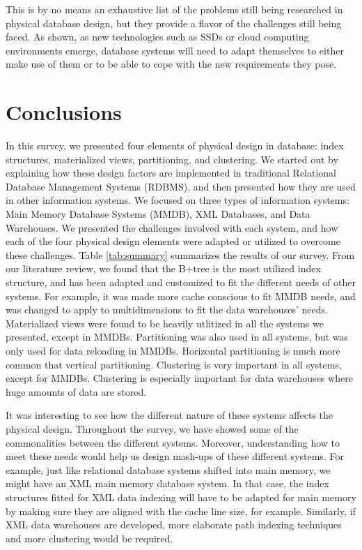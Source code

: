 \documentclass[12pt,a4paper]{article}
\begin{document}
This is by no means an exhaustive list of the problems still being researched in physical database design, but they provide a flavor of the challenges still
being faced. As shown, as new technologies such as SSDs or cloud computing environments emerge, database systems will need to adapt themselves to either make
use of them or to be able to cope with the new requirements they pose.

\section{Conclusions}
\label{SEC-CONCL}

In this survey, we presented four elements of physical design in database: index structures, materialized views, partitioning, and clustering. We started out
by explaining how these design factors are implemented in traditional Relational Database Management Systems (RDBMS), and then presented how they are used in
other information systems. We focused on three types of information systems: Main Memory Database Systems (MMDB), XML Databases, and Data Warehouses. We
presented the challenges involved with each system, and how each of the four physical design elements were adapted or utilized to overcome these
challenges. Table \ref{tab:summary} summarizes the results of our survey. From our literature review, we found that the B+tree is the most utilized index
structure, and has been adapted and customized to fit the different needs of other systems. For example, it was made more cache conscious to fit MMDB needs,
and was changed to apply to multidimensions to fit the data warehouses' needs. Materialized views were found to be heavily utlitized in all the systems we
presented, except in MMDBs. Partitioning was also used in all systems, but was only used for data reloading in MMDBs. Horizontal partitioning is much more
common that vertical partitioning. Clustering is very important in all systems, except for MMDBs. Clustering is especially important for data warehouses
where huge amounts of data are stored.

It was interesting to see how the different nature of these systems affects the physical design. Throughout the survey, we have showed some of the
commonalities between the different systems. Moreover, understanding how to meet these needs would help us design mash-ups of these different systems. For
example, just like relational database systems shifted into main memory, we might have an XML main memory database system. In that case, the index structures
fitted for XML data indexing will have to be adapted for main memory by making sure they are aligned with the cache line size, for example. Similarly, if XML
data warehouses are developed, more elaborate path indexing techniques and more clustering would be required. 
\end{document}
